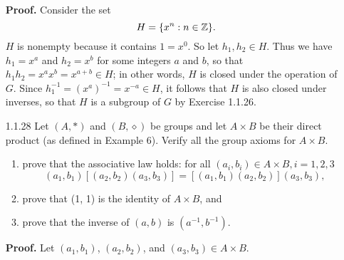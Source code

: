 \begin{enumerate}
      \textbf{Proof.} Consider the set
      $$H = \{x^n : n \in \mathbb{Z}\}.$$
      $H$ is nonempty because it contains $1 = x^0$. So let $h_1, h_2 \in H$.
      Thus we have $h_1 = x^a$ and $h_2 = x^b$ for some integers $a$ and $b$, so
      that $h_1h_2 = x^ax^b = x^{a+b} \in H$; in other words, $H$ is closed
      under the operation of $G$. Since $h_1^{-1} = (x^a)^{-1} = x^{-a} \in H$, 
      it follows that $H$ is also closed under inverses, so that $H$ is a
      subgroup of $G$ by Exercise 1.1.26.
   \item[1.1.28]  Let $(A, *)$ and $(B, \diamond)$ be groups and let
                  $A \times B$ be their direct product (as defined in Example
                  6). Verify all the group axioms for $A \times B$.
                  \begin{enumerate}
                     \item prove that the associative law holds: for all
                           $(a_i, b_i) \in A \times B, i = 1, 2, 3$
                           $$(a_1, b_1)[(a_2, b_2)(a_3, b_3)] =
                            [(a_1, b_1)(a_2, b_2)](a_3, b_3),$$
                     \item prove that (1, 1) is the identity of $A \times B$,
                           and
                     \item prove that the inverse of $(a, b)$ is
                           $(a^{-1}, b^{-1})$.
                  \end{enumerate}

      \textbf{Proof.} Let $(a_1, b_1)$, $(a_2, b_2)$, and
      $(a_3, b_3) \in A \times B$.


\end{enumerate}
